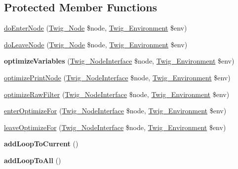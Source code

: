 \subsection*{Protected Member Functions}
\begin{DoxyCompactItemize}
\item 
\hyperlink{classTwig__NodeVisitor__Optimizer_ab6b55f8feb2d9a1243753c86a2c093ce}{do\+Enter\+Node} (\hyperlink{classTwig__Node}{Twig\+\_\+\+Node} \$node, \hyperlink{classTwig__Environment}{Twig\+\_\+\+Environment} \$env)
\item 
\hyperlink{classTwig__NodeVisitor__Optimizer_a526caedada92c9722edc6eff639d4af2}{do\+Leave\+Node} (\hyperlink{classTwig__Node}{Twig\+\_\+\+Node} \$node, \hyperlink{classTwig__Environment}{Twig\+\_\+\+Environment} \$env)
\item 
{\bfseries optimize\+Variables} (\hyperlink{interfaceTwig__NodeInterface}{Twig\+\_\+\+Node\+Interface} \$node, \hyperlink{classTwig__Environment}{Twig\+\_\+\+Environment} \$env)\hypertarget{classTwig__NodeVisitor__Optimizer_a7496ca1caddcc0033f5aa4d536664c45}{}\label{classTwig__NodeVisitor__Optimizer_a7496ca1caddcc0033f5aa4d536664c45}

\item 
\hyperlink{classTwig__NodeVisitor__Optimizer_a91329fef54b451254509576b4f1a8f26}{optimize\+Print\+Node} (\hyperlink{interfaceTwig__NodeInterface}{Twig\+\_\+\+Node\+Interface} \$node, \hyperlink{classTwig__Environment}{Twig\+\_\+\+Environment} \$env)
\item 
\hyperlink{classTwig__NodeVisitor__Optimizer_ad51cdd9837153c84dfa18155f545a26b}{optimize\+Raw\+Filter} (\hyperlink{interfaceTwig__NodeInterface}{Twig\+\_\+\+Node\+Interface} \$node, \hyperlink{classTwig__Environment}{Twig\+\_\+\+Environment} \$env)
\item 
\hyperlink{classTwig__NodeVisitor__Optimizer_ae217ca8cb1d9e467edbdfb30df84cb21}{enter\+Optimize\+For} (\hyperlink{interfaceTwig__NodeInterface}{Twig\+\_\+\+Node\+Interface} \$node, \hyperlink{classTwig__Environment}{Twig\+\_\+\+Environment} \$env)
\item 
\hyperlink{classTwig__NodeVisitor__Optimizer_aa0cfe1cff77704b213ca94a7169501e0}{leave\+Optimize\+For} (\hyperlink{interfaceTwig__NodeInterface}{Twig\+\_\+\+Node\+Interface} \$node, \hyperlink{classTwig__Environment}{Twig\+\_\+\+Environment} \$env)
\item 
{\bfseries add\+Loop\+To\+Current} ()\hypertarget{classTwig__NodeVisitor__Optimizer_ae34127e1bcaf589e5ecfa509aa84d8bc}{}\label{classTwig__NodeVisitor__Optimizer_ae34127e1bcaf589e5ecfa509aa84d8bc}

\item 
{\bfseries add\+Loop\+To\+All} ()\hypertarget{classTwig__NodeVisitor__Optimizer_a2f9309d236319b6085682bdf98f85add}{}\label{classTwig__NodeVisitor__Optimizer_a2f9309d236319b6085682bdf98f85add}

\end{DoxyCompactItemize}
